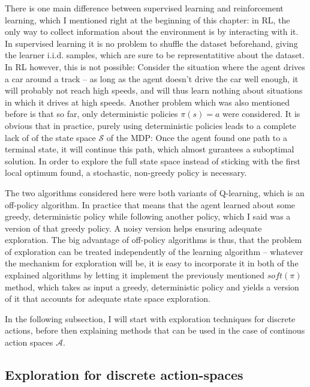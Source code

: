 There is one main difference between supervised learning and reinforcement learning, which I mentioned right at the beginning of this chapter: in RL, the only way to collect information about the environment is by interacting with it. In supervised learning it is no problem to shuffle the dataset beforehand, giving the learner i.i.d. samples, which are sure to be representatitive about the dataset. In RL however, this is not possible: Consider the situation where the agent drives a car around a track -- as long as the agent doesn't drive the car well enough, it will probably not reach high speeds, and will thus learn nothing about situations in which it drives at high speeds. Another problem which was also mentioned before is that so far, only deterministic policies $\pi(s) = a$ were considered. It is obvious that in practice, purely using deterministic policies leads to a complete lack of  of the state space $\mathcal{S}$ of the MDP: Once the agent found one path to a terminal state, it will continue  this path, which almost gurantees a suboptimal solution. In order to explore the full state space instead of sticking with the first local optimum found, a stochastic, non-greedy policy is necessary.

The two algorithms considered here were both variants of Q-learning, which is an off-policy algorithm. In practice that means that the agent learned about some greedy, deterministic policy while following another policy, which I said was a  version of that greedy policy. A noisy version helps ensuring adequate exploration. The big advantage of off-policy algorithms is thus, that the problem of exploration can be treated independently of the learning algorithm -- whatever the mechanism for exploration will be, it is easy to incorporate it in both of the explained algorithms by letting it implement the previously mentioned $soft(\pi)$ method, which takes as input a greedy, deterministic policy and yields a version of it that accounts for adequate state space exploration.

In the following subsection, I will start with exploration techniques for discrete actions, before then explaining methods that can be used in the case of continous action spaces $\mathcal{A}$.



\subsection{Exploration for discrete action-spaces}

